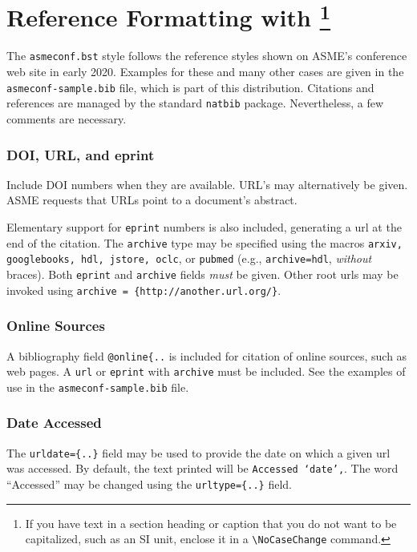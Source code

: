 \documentclass[varvw,largesc,upint,mathalfa=cal=euler,hyphenate,balance,lang-second=french,lang=english,colorlinks]{asmeconf} %
\begin{document}
\section{Reference Formatting with \footnote{If you have text in a section heading or caption that you do not want to be capitalized, such as an SI unit, enclose it in a \texttt{\textbackslash NoCaseChange} command.}}\label{sec:references}

The {\upshape\texttt{asmeconf.bst}}   style follows the reference styles shown on ASME's conference web site in early 2020. Examples for these and many other cases are given in the \texttt{asmeconf-sample.bib} file, which is part of this distribution. Citations and references are managed by the standard \texttt{natbib} package.  Nevertheless, a few comments are necessary. 


\subsubsection*{DOI, URL, and eprint} Include DOI numbers when they are available.  URL's may alternatively be given. ASME requests that URLs point to a document's abstract.

Elementary support for \texttt{eprint} numbers is also included, generating a url at the end of the citation. The \texttt{archive} type may be specified using the macros \texttt{arxiv, googlebooks, hdl, jstore, oclc}, or \texttt{pubmed} (e.g., \texttt{archive=hdl},  \textit{without} braces). Both \texttt{eprint} and \texttt{archive} fields \textit{must} be given. Other root urls may be invoked using \verb|archive = {http://another.url.org/}|.

\subsubsection*{Online Sources} A bibliography field \verb|@online{..| is included for citation of online sources, such as web pages. A \texttt{url} or \texttt{eprint} with \texttt{archive} must be included. See the examples of use in the \texttt{asmeconf-sample.bib} file. 

\subsubsection*{Date Accessed} The \verb|urldate={..}| field may be used to provide the date on which a given url was accessed. By default, the text printed will be \texttt{Accessed `date',}. The word ``Accessed'' may be changed using the \verb|urltype={..}| field.
\end{document}

